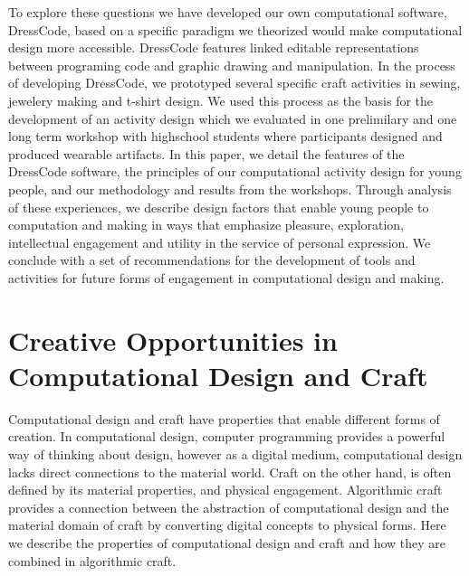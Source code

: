 \documentclass{sigchi}
\begin{document}
To explore these questions we have developed our own computational software, DressCode, based on a specific paradigm we theorized would make computational design more accessible. DressCode features linked editable representations between programing code and graphic drawing and manipulation. In the process of developing DressCode, we prototyped several specific craft activities in sewing, jewelery making and t-shirt design. We used this process as the basis for the development of an activity design which we evaluated in one prelimilary and one long term workshop with highschool students where participants designed and produced wearable artifacts. In this paper, we detail the features of the DressCode software, the principles of our computational activity design for young people, and our methodology and results from the workshops. Through analysis of these experiences, we describe design factors that enable young people to computation and making in ways that emphasize pleasure, exploration, intellectual engagement and utility in the service of personal expression. We conclude with a set of recommendations for the development of tools and activities for future forms of engagement in computational design and making.

\section{Creative Opportunities in Computational Design and Craft}
Computational design and craft have properties that enable different forms of creation. In computational design, computer programming provides a powerful way of thinking about design, however as a digital medium, computational design lacks direct connections to the material world. Craft on the other hand, is often defined by its material properties, and physical engagement. Algorithmic craft provides a connection between the abstraction of computational design and the material domain of craft by converting digital concepts to physical forms. Here we describe the properties of computational design and craft and how they are combined in algorithmic craft.
\end{document}

